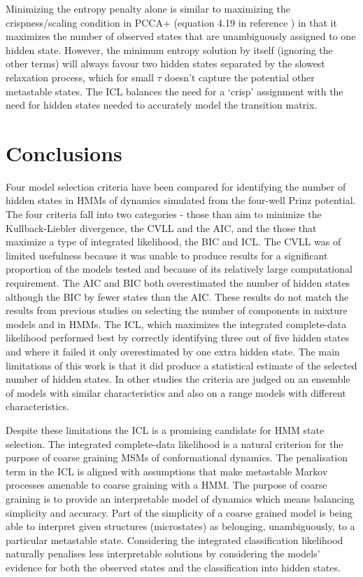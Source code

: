 Minimizing the entropy penalty alone is similar to maximizing the crispness/scaling condition in PCCA+ (equation 4.19 in reference \cite{deuflhardRobustPerronCluster2005b}) in that it maximizes the number of  observed states that are unambiguously assigned to one hidden state. However, the minimum entropy solution by itself (ignoring the other terms) will always favour two hidden states separated by the slowest relaxation process, which for small $\tau$ doesn't capture the potential other metastable states. The ICL balances the need for a `crisp' assignment with the need for hidden states needed to accurately  model the transition matrix. 

\section{Conclusions}\label{sec:hmm_conclusions}
Four model selection criteria have been compared for identifying the number of hidden states in HMMs of dynamics simulated from the four-well Prinz potential. The four criteria fall into two categories - those than aim to minimize the Kullback-Liebler divergence, the CVLL and the AIC, and the those that maximize a type of integrated likelihood, the BIC and ICL. The CVLL was of limited usefulness because it was unable to produce results for a significant proportion of the models tested and because of its relatively large computational requirement. The AIC and BIC both overestimated the number of hidden states although the BIC by fewer states than the AIC. These results do not match the results from previous studies on selecting the number of components in mixture models and in HMMs. The ICL, which maximizes the integrated complete-data likelihood performed best by correctly identifying three out of five hidden states and where it failed it only overestimated by one extra hidden state. The main limitations of this work is that it did produce a statistical estimate of the selected number of hidden states. In other studies \cite{biernackiAssessingMixtureModel2000a} the criteria are judged on an ensemble of models with similar characteristics and also on a range models with different characteristics.  

Despite these limitations the ICL is a promising candidate for HMM state selection. The integrated complete-data likelihood is a natural criterion for the purpose of coarse graining  MSMs of conformational dynamics. The penalisation term in the ICL is aligned with assumptions that make metastable Markov processes amenable to coarse graining with a HMM. The purpose of coarse graining is to provide an interpretable model of dynamics which means balancing simplicity and accuracy. Part of the simplicity of a coarse grained model is being able to interpret given structures (microstates) as belonging, unambiguously, to a particular metastable state. Considering the integrated classification likelihood naturally penalises less interpretable solutions by considering the models' evidence for both the observed states and the classification into hidden states. 



